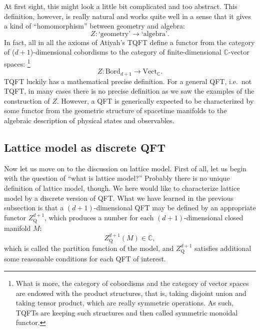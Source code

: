 At first sight, this might look a little bit complicated and too abstract.
This definition, however, is really natural and works quite well in
a sense that it gives a kind of ``homomorphism'' between geometry
and algebra:
\begin{equation*}
  Z : \text{`geometry'} \longrightarrow \text{`algebra'}.
\end{equation*}
In fact, all in all the axioms of Atiyah's TQFT define a functor
from the category of ($d+1$)-dimensional cobordisms to the category
of finite-dimensional $\mathbb{C}$-vector spaces:%
%
\footnote{What is more, the category of cobordisms and the category of vector
spaces are endowed with the product structures, that is, taking disjoint
union and taking tensor product, which are really symmetric operations.
As such, TQFTs are keeping such structures and then
called symmetric monoidal functor. }
%
\begin{equation}
  Z:\mathrm{Bord}_{d+1}  \longrightarrow  \mathrm{Vect}_{\mathbb{C}}.
\end{equation}
TQFT luckily has a mathematical precise definition. For a general
QFT, i.e.~not TQFT, in many cases there is no precise definition as
we saw the examples of the construction of $Z$. However, a QFT is
generically expected to be characterized by some functor from the
geometric structure of spacetime manifolds to the algebraic description
of physical states and observables.





\subsection{Lattice model as discrete QFT}
\label{sec:lattice_model}

Now let us move on to the discussion on lattice model. First of all,
let us begin with the question of ``what is lattice model?'' Probably
there is no unique definition of lattice model, though. We here would like
to characterize lattice model by a discrete version of QFT. What we
have learned in the previous subsection is that a $(d+1)$-dimensional
QFT may be defined by an appropriate functor $Z_{\mathrm{Q}}^{d+1}$,
which produces a number for each $(d+1)$-dimensional closed manifold
$M$:
\begin{equation}
  Z_{\mathrm{Q}}^{d+1}(M)  \in  \mathbb{C},
\end{equation}
which is called the partition function of the model, and $Z_{\mathrm{Q}}^{d+1}$
satisfies additional some reasonable conditions for each QFT of interest.

